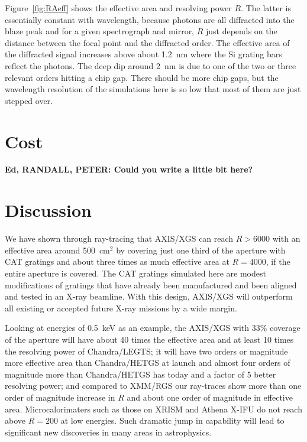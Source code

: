 \documentclass[12pt]{spieman}  %
\begin{document}
\begin{spacing}{1}
Figure~\ref{fig:RAeff} shows the effective area and resolving power $R$. The latter is essentially constant with wavelength, because photons are all diffracted into the blaze peak and for a given spectrograph and mirror, $R$ just depends on the distance between the focal point and the diffracted order.
The effective area of the diffracted signal increases above about 1.2~nm where the Si grating bars reflect the photons. The deep dip around 2~nm is due to one of the two or three relevant orders hitting a chip gap. There should be more chip gaps, but the wavelength resolution of the simulations here is so low that most of them are just stepped over.


\section{Cost}

\textbf{Ed, RANDALL, PETER: Could you write a little bit here?}

\section{Discussion}
We have shown through ray-tracing that AXIS/XGS can reach $R>6000$ with an effective area around 500~cm$^2$ by covering just one third of the aperture with CAT gratings and about three times as much effective area at $R=4000$, if the entire aperture is covered. The CAT gratings simulated here are modest modifications of gratings that have already been manufactured and been aligned and tested in an X-ray beamline\cite{2022arXiv220609013H}. With this design, AXIS/XGS will outperform all existing or accepted future X-ray missions by a wide margin.

Looking at energies of 0.5~keV as an example, the AXIS/XGS with 33\% coverage of the aperture will have about 40 times the effective area and at least 10 times the resolving power of Chandra/LEGTS; it will have two orders or magnitude more effective area than Chandra/HETGS at launch and almost four orders of magnitude more than Chandra/HETGS has today and a factor of 5 better resolving power\cite{2005PASP..117.1144C}; and compared to XMM/RGS our ray-traces show more than one order of magnitude increase in $R$ and about one order of magnitude in effective area.
Microcalorimaters such as those on XRISM\cite{10.1117/12.2565812} and Athena X-IFU do not reach above $R=200$ at low energies. Such dramatic jump in capability will lead to significant new discoveries in many areas in astrophysics.


\end{spacing}
\end{document}
